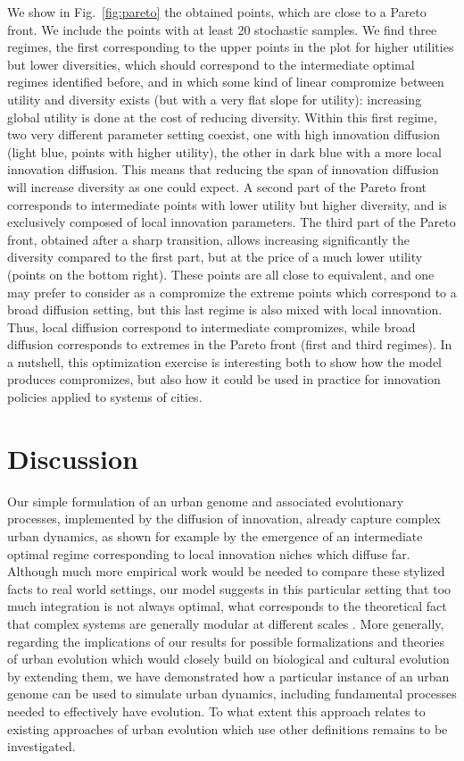 \documentclass[letterpaper]{article}
\begin{document}
We show in Fig.~\ref{fig:pareto} the obtained points, which are close to a Pareto front. We include the points with at least 20 stochastic samples. We find three regimes, the first corresponding to the upper points in the plot for higher utilities but lower diversities, which should correspond to the intermediate optimal regimes identified before, and in which some kind of linear compromize between utility and diversity exists (but with a very flat slope for utility): increasing global utility is done at the cost of reducing diversity. Within this first regime, two very different parameter setting coexist, one with high innovation diffusion (light blue, points with higher utility), the other in dark blue with a more local innovation diffusion. This means that reducing the span of innovation diffusion will increase diversity as one could expect. A second part of the Pareto front corresponds to intermediate points with lower utility but higher diversity, and is exclusively composed of local innovation parameters. The third part of the Pareto front, obtained after a sharp transition, allows increasing significantly the diversity compared to the first part, but at the price of a much lower utility (points on the bottom right). These points are all close to equivalent, and one may prefer to consider as a compromize the extreme points which correspond to a broad diffusion setting, but this last regime is also mixed with local innovation. Thus, local diffusion correspond to intermediate compromizes, while broad diffusion corresponds to extremes in the Pareto front (first and third regimes). In a nutshell, this optimization exercise is interesting both to show how the model produces compromizes, but also how it could be used in practice for innovation policies applied to systems of cities.



\section{Discussion}

Our simple formulation of an urban genome and associated evolutionary processes, implemented by the diffusion of innovation, already capture complex urban dynamics, as shown for example by the emergence of an intermediate optimal regime corresponding to local innovation niches which diffuse far. Although much more empirical work would be needed to compare these stylized facts to real world settings, our model suggests in this particular setting that too much integration is not always optimal, what corresponds to the theoretical fact that complex systems are generally modular at different scales \citep{ethiraj2004modularity}. More generally, regarding the implications of our results for possible formalizations and theories of urban evolution which would closely build on biological and cultural evolution by extending them, we have demonstrated how a particular instance of an urban genome can be used to simulate urban dynamics, including fundamental processes needed to effectively have evolution. To what extent this approach relates to existing approaches of urban evolution which use other definitions remains to be investigated.
\end{document}
